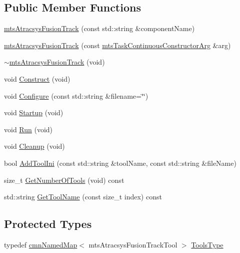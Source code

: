 \subsection*{Public Member Functions}
\begin{DoxyCompactItemize}
\item 
\hyperlink{classmts_atracsys_fusion_track_a5bcca2cd451655e117fbeeabc7a23d33}{mts\+Atracsys\+Fusion\+Track} (const std\+::string \&component\+Name)
\item 
\hyperlink{classmts_atracsys_fusion_track_a8a04117b698ea15b2e950d41b5e744bc}{mts\+Atracsys\+Fusion\+Track} (const \hyperlink{classmts_task_continuous_constructor_arg}{mts\+Task\+Continuous\+Constructor\+Arg} \&arg)
\item 
\hyperlink{classmts_atracsys_fusion_track_ab96e81a7d51c76dde68824c2c278856e}{$\sim$mts\+Atracsys\+Fusion\+Track} (void)
\item 
void \hyperlink{classmts_atracsys_fusion_track_a0d38344ac2e2b6625b8d2b962907e3c2}{Construct} (void)
\item 
void \hyperlink{classmts_atracsys_fusion_track_a5cb7ab3697df62aeba09323a6850b0ed}{Configure} (const std\+::string \&filename=\char`\"{}\char`\"{})
\item 
void \hyperlink{classmts_atracsys_fusion_track_a0fd653e583a93199b17363d1ea814c9e}{Startup} (void)
\item 
void \hyperlink{classmts_atracsys_fusion_track_a061e6f4c62d6c55763d29d52b39c3d8b}{Run} (void)
\item 
void \hyperlink{classmts_atracsys_fusion_track_a07fb7211b705cc4c8202aeb88bed9393}{Cleanup} (void)
\item 
bool \hyperlink{classmts_atracsys_fusion_track_a51665abf9e4115443a5f462f086b305d}{Add\+Tool\+Ini} (const std\+::string \&tool\+Name, const std\+::string \&file\+Name)
\item 
size\+\_\+t \hyperlink{classmts_atracsys_fusion_track_ab6b5df551fecc8da355afdcbeebfb5a4}{Get\+Number\+Of\+Tools} (void) const 
\item 
std\+::string \hyperlink{classmts_atracsys_fusion_track_af05c7d17287e4688fcdaea85861d67d9}{Get\+Tool\+Name} (const size\+\_\+t index) const 
\end{DoxyCompactItemize}
\subsection*{Protected Types}
\begin{DoxyCompactItemize}
\item 
typedef \hyperlink{classcmn_named_map}{cmn\+Named\+Map}$<$ mts\+Atracsys\+Fusion\+Track\+Tool $>$ \hyperlink{classmts_atracsys_fusion_track_a2c58e85f9c00731a4b06b57142177ba1}{Tools\+Type}
\end{DoxyCompactItemize}
